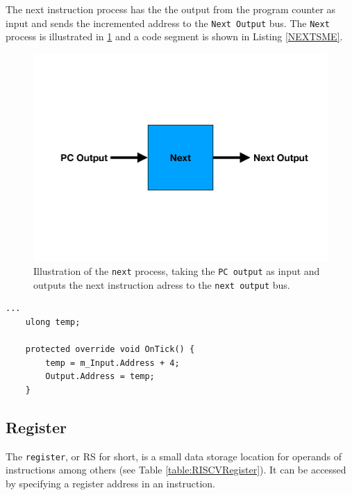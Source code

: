         The next instruction process has the the output from the program counter as input and sends the incremented address to the \texttt{Next Output} bus. The \texttt{Next} process is illustrated in \ref{fig:NEXT} and a code segment is shown in Listing \ref{NEXTSME}.
        
        \begin{figure}[h!]
            \centering
            \includegraphics[scale=0.34]{pictures/Next.pdf}
            \caption{Illustration of the \texttt{next} process, taking the \texttt{PC output} as input and outputs the next instruction adress to the \texttt{next output} bus.}
            \label{fig:NEXT}
        \end{figure}
    
        \begin{minipage}{\linewidth}
            \begin{lstlisting}[language={[Sharp]C}, caption={A slice of the \texttt{Next} process SME code. Here we declare a temporary varible, which contains the program counter output. We increment the temporary variable by four and place it in the output bus.},captionpos=b, label = NEXTSME]
...
    ulong temp;
    
    protected override void OnTick() {
        temp = m_Input.Address + 4;
        Output.Address = temp;
    }
            \end{lstlisting}
        \end{minipage}  
        
    
    \subsection{Register}
        The \texttt{register}, or RS for short, is a small data storage location for operands of instructions among others (see Table \ref{table:RISCVRegister}). It can be accessed by specifying a register address in an instruction. 
        
